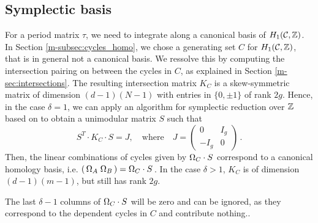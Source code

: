 \documentclass[main.tex]{subfiles}
\begin{document}

  \subsection{Symplectic basis}\label{subsec:symp_basis}
  
  For a period matrix $\tau$, we need to integrate along a canonical basis of $H_1(\mathcal{C},\mathbb{Z})$. In Section \ref{m-subsec:cycles_homo}, we chose a generating set $C$ for $H_1(\mathcal{C},\mathbb{Z})$, that is in general not 
  a canonical basis. \abstand We 
  ressolve this by computing the intersection pairing on between the cycles in $C$, as explained in Section \ref{m-sec:intersections}. The resulting intersection matrix $K_C$
   is a skew-symmetric matrix of dimension $(d-1)(N-1)$ with entries in $\{ 0,\pm 1\}$ of rank $2g$. Hence, in the case $\delta = 1$, we can apply an algorithm 
  for symplectic reduction over $\mathbb{Z}$ based on
    \cite[Theorem 18]{KB2002} to obtain a unimodular matrix $S$ such that
  $$S^T \cdot K_C \cdot S = J, \quad \text{where} \quad J = \begin{pmatrix} 0 & I_g \\ -I_g & 0 \end{pmatrix}\,.$$
  Then, the linear combinations of cycles given by $\Omega_C \cdot S$ correspond to a canonical homology basis, i.e. $( \, \Omega_A \; \Omega_B \, ) = \Omega_C \cdot S$\,.
  In the case $\delta > 1$, $K_C$ is of dimension $(d-1)(m-1)$, but still has rank $2g$. 
  
  The last $\delta-1$ columns of $\Omega_C \cdot S$ will be zero and can be ignored, as they correspond to the dependent cycles
  in $C$ and contribute nothing..
  
 
\biblio
\end{document}
